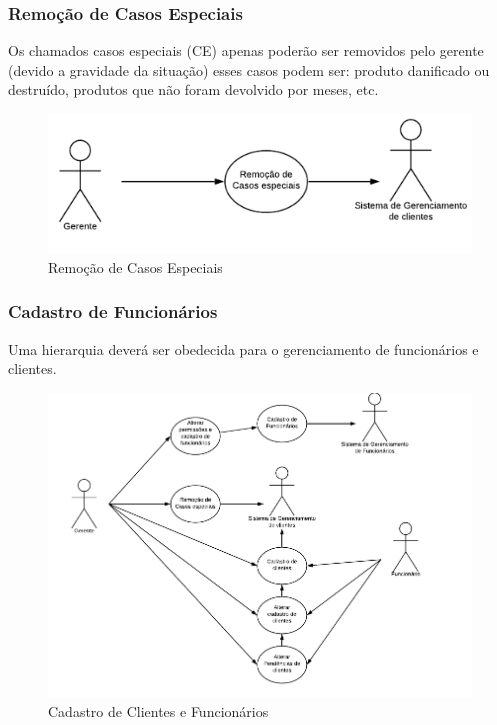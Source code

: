 \documentclass{article}
\begin{document}
        \subsubsection{Remoção de Casos Especiais}
            Os chamados casos especiais (CE) apenas poderão ser removidos pelo gerente (devido a gravidade da situação) esses casos podem ser: produto danificado ou destruído, produtos que não foram devolvido por meses, etc.
        \begin{figure}[H]
            \label{fig: Caso de uso restrição} 
            \centering
            \includegraphics[width=1\textwidth]{pictures/removeespeciais.PNG} 
            \caption {Remoção de Casos Especiais} 
        \end{figure}
        
        \subsubsection{Cadastro de Funcionários}
        Uma hierarquia deverá ser obedecida para o gerenciamento de funcionários e clientes.
        \begin{figure}[H]
            \label{fig: cadastro} 
            \centering
            \includegraphics[width=1.0\textwidth]{pictures/cadastro.PNG} 
            \caption {Cadastro de Clientes e Funcionários} 
        \end{figure}        
        
\end{document}
